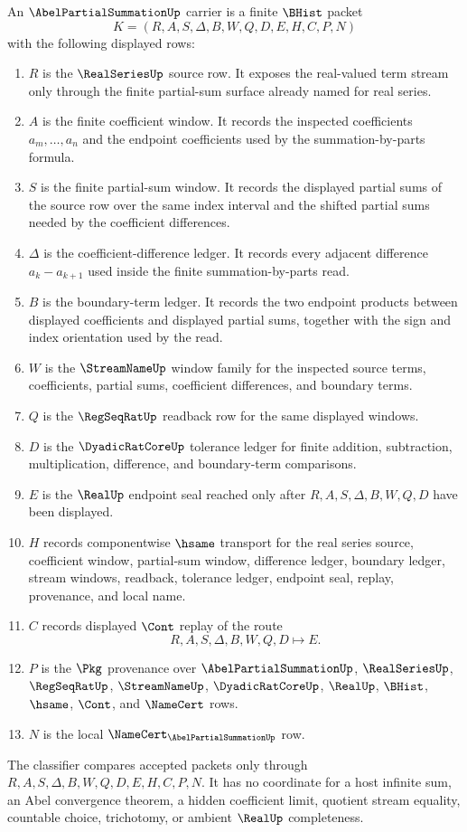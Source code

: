 \begin{definition}
\label{def:abel-partial-summation-carrier}
An $\AbelPartialSummationUp$ carrier is a finite $\BHist$ packet
$$
K=(R,A,S,\Delta,B,W,Q,D,E,H,C,P,N)
$$
with the following displayed rows:
\begin{enumerate}
\item $R$ is the $\RealSeriesUp$ source row. It exposes the real-valued term stream only through the finite partial-sum surface already named for real series.
\item $A$ is the finite coefficient window. It records the inspected coefficients $a_m,\ldots,a_n$ and the endpoint coefficients used by the summation-by-parts formula.
\item $S$ is the finite partial-sum window. It records the displayed partial sums of the source row over the same index interval and the shifted partial sums needed by the coefficient differences.
\item $\Delta$ is the coefficient-difference ledger. It records every adjacent difference $a_k-a_{k+1}$ used inside the finite summation-by-parts read.
\item $B$ is the boundary-term ledger. It records the two endpoint products between displayed coefficients and displayed partial sums, together with the sign and index orientation used by the read.
\item $W$ is the $\StreamNameUp$ window family for the inspected source terms, coefficients, partial sums, coefficient differences, and boundary terms.
\item $Q$ is the $\RegSeqRatUp$ readback row for the same displayed windows.
\item $D$ is the $\DyadicRatCoreUp$ tolerance ledger for finite addition, subtraction, multiplication, difference, and boundary-term comparisons.
\item $E$ is the $\RealUp$ endpoint seal reached only after $R,A,S,\Delta,B,W,Q,D$ have been displayed.
\item $H$ records componentwise $\hsame$ transport for the real series source, coefficient window, partial-sum window, difference ledger, boundary ledger, stream windows, readback, tolerance ledger, endpoint seal, replay, provenance, and local name.
\item $C$ records displayed $\Cont$ replay of the route
$$
R,A,S,\Delta,B,W,Q,D \longmapsto E .
$$
\item $P$ is the $\Pkg$ provenance over $\AbelPartialSummationUp$, $\RealSeriesUp$, $\RegSeqRatUp$, $\StreamNameUp$, $\DyadicRatCoreUp$, $\RealUp$, $\BHist$, $\hsame$, $\Cont$, and $\NameCert$ rows.
\item $N$ is the local $\NameCert_{\AbelPartialSummationUp}$ row.
\end{enumerate}
The classifier compares accepted packets only through $R,A,S,\Delta,B,W,Q,D,E,H,C,P,N$. It has no coordinate for a host infinite sum, an Abel convergence theorem, a hidden coefficient limit, quotient stream equality, countable choice, trichotomy, or ambient $\RealUp$ completeness.
\end{definition}

